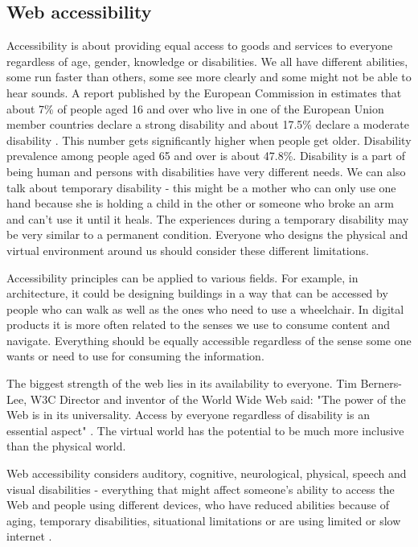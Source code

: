 \documentclass{master_thesis}
\begin{document}
\subsection{Web accessibility}

Accessibility is about providing equal access to goods and services to everyone regardless of age, gender, knowledge or disabilities. We all have different abilities, some run faster than others, some see more clearly and some might not be able to hear sounds. A report published by the European Commission in \citeyear{Grammenos2020} estimates that about 7\% of people aged 16 and over who live in one of the European Union member countries declare a strong disability and about 17.5\% declare a moderate disability \citep{Grammenos2020}. This number gets significantly higher when people get older. Disability prevalence among people aged 65 and over is about 47.8\%.  Disability is a part of being human and persons with disabilities have very different needs. We can also talk about temporary disability - this might be a mother who can only use one hand because she is holding a child in the other or someone who broke an arm and can't use it until it heals. The experiences during a temporary disability may be very similar to a permanent condition. Everyone who designs the physical and virtual environment around us should consider these different limitations.

Accessibility principles can be applied to various fields. For example, in architecture, it could be designing buildings in a way that can be accessed by people who can walk as well as the ones who need to use a wheelchair. In digital products it is more often related to the senses we use to consume content and navigate. Everything should be equally accessible regardless of the sense some one wants or need to use for consuming the information.

The biggest strength of the web lies in its availability to everyone. Tim Berners-Lee, W3C Director and inventor of the World Wide Web said: "The power of the Web is in its universality. Access by everyone regardless of disability is an essential aspect" \citep{WWWC1997}. The virtual world has the potential to be much more inclusive than the physical world.

Web accessibility considers auditory, cognitive, neurological, physical, speech and visual disabilities - everything that might affect someone's ability to access the Web and people using different devices, who have reduced abilities because of aging, temporary disabilities, situational limitations or are using limited or slow internet \citep{Henry2022}.
\end{document}
